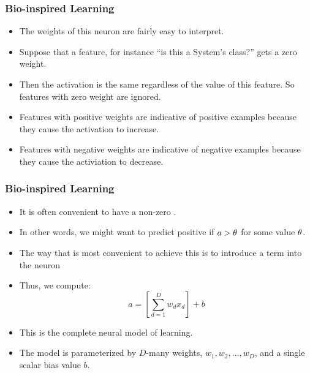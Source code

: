 \documentclass[trans]{beamer}
\begin{document}
\begin{frame}
  \frametitle{Bio-inspired Learning}
\begin{itemize}
\item
The weights of this neuron are fairly easy to interpret.
\item  Suppose that
a feature, for instance ``is this a System's class?'' gets a zero
weight. 
\item Then the activation is the same regardless of the value of
this feature.  So features with zero weight are ignored.  
\item Features
with positive weights are indicative of positive examples because they
cause the activation to increase.
\item  Features with negative weights are
indicative of negative examples because they cause the activiation to
decrease.
\end{itemize}
\end{frame}


\begin{frame}
  \frametitle{Bio-inspired Learning}
\begin{itemize}
\item
It is often convenient to have a non-zero . 
\item In
other words, we might want to predict positive if $a > \theta$ for some
value $\theta$. 
\item The way that is most convenient to achieve this is to
introduce a  term into the neuron
\item  Thus, we
compute:
\begin{equation} \label{eq:perc:sumbias}
a = \left[ \sum_{d=1}^D w_d x_d \right] + b
\end{equation}
\item
This is the complete neural model of learning.
\item  The model is
parameterized by $D$-many weights, $w_1, w_2, \dots, w_D$, and a
single scalar bias value $b$.
\end{itemize}
\end{frame}
\end{document}
